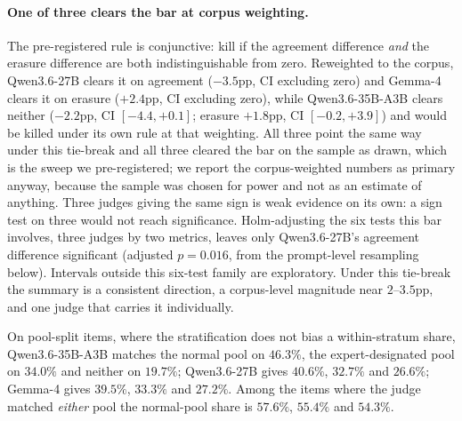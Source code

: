 \documentclass{article}
\begin{document}
\paragraph{One of three clears the bar at corpus weighting.} The pre-registered rule is
conjunctive: kill if the agreement difference \emph{and} the erasure difference are both
indistinguishable from zero. Reweighted to the corpus, Qwen3.6-27B clears it on agreement
($-3.5$pp, CI excluding zero) and Gemma-4 clears it on erasure ($+2.4$pp, CI excluding
zero), while Qwen3.6-35B-A3B clears neither ($-2.2$pp, CI $[-4.4, +0.1]$; erasure $+1.8$pp,
CI $[-0.2, +3.9]$) and would be killed under its own rule at that weighting. All three
point the same way under this tie-break and all three cleared the bar on the sample as
drawn, which is the sweep we pre-registered; we report the corpus-weighted numbers as
primary anyway, because the sample was chosen for power and not as an estimate of anything.
Three judges giving the same sign is weak evidence on its own: a sign test on three would
not reach significance. Holm-adjusting the six tests this bar involves, three judges by two
metrics, leaves only Qwen3.6-27B's agreement difference significant (adjusted $p = 0.016$,
from the prompt-level resampling below). Intervals outside this six-test family are
exploratory. Under this tie-break the summary is a consistent direction, a corpus-level
magnitude near $2$--$3.5$pp, and one judge that carries it individually.

On pool-split items, where the stratification does not bias a within-stratum share,
Qwen3.6-35B-A3B matches the normal pool on $46.3\%$, the expert-designated pool on $34.0\%$ and neither on
$19.7\%$; Qwen3.6-27B gives $40.6\%$, $32.7\%$ and $26.6\%$; Gemma-4 gives $39.5\%$,
$33.3\%$ and $27.2\%$. Among the items where the judge matched \emph{either} pool the normal-pool
share is $57.6\%$, $55.4\%$ and $54.3\%$.
\end{document}
